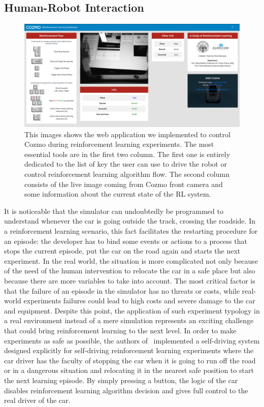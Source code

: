\subsection{Human-Robot Interaction} \label{subsec:human-robot-interaction}

\begin{figure}

    \centering
    \includegraphics[width=\textwidth]{img/dashboard.png}
    \caption[Web Application implemented to Control Cozmo]{This images shows the web application we implemented to control Cozmo during reinforcement learning experiments. The most essential tools are in the first two column. The first one is entirely dedicated to the list of key the user can use to drive the robot or control reinforcement learning algorithm flow. The second column consists of the live image coming from Cozmo front camera and some information about the current state of the RL system.}
    \label{fig:dashboard}
\end{figure}

It is noticeable that the simulator can undoubtedly be programmed to understand whenever the car is going outside the track, crossing the roadside.
In a reinforcement learning scenario, this fact facilitates the restarting procedure for an episode: the developer has to bind some events or actions to a process that stops the current episode, put the car on the road again and starts the next experiment.
In the real world, the situation is more complicated not only because of the need of the human intervention to relocate the car in a safe place but also because there are more variables to take into account.
The most critical factor is that the failure of an episode in the simulator has no threats or costs, while real-world experiments failures could lead to high costs and severe damage to the car and equipment.
Despite this point, the application of such experiment typology in a real environment instead of a mere simulation represents an exciting challenge that could bring reinforcement learning to the next level.
In order to make experiments as safe as possible, the authors of~\cite{kendall2018learning,kendall2019learning} implemented a self-driving system designed explicitly for self-driving reinforcement learning experiments where the car driver has the faculty of stopping the car when it is going to run off the road or in a dangerous situation and relocating it in the nearest safe position to start the next learning episode.
By simply pressing a button, the logic of the car disables reinforcement learning algorithm decision and gives full control to the real driver of the car.

